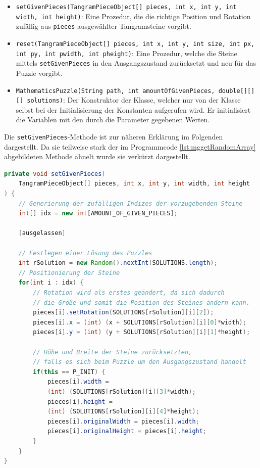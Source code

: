 \begin{sloppypar}
\begin{itemize}
        \item \texttt{setGivenPieces(TangramPieceObject[] pieces, int x, int y, int width, int height)}: Eine Prozedur, die die richtige Position und Rotation zufällig aus \texttt{pieces} ausgewählter Tangramsteine vorgibt.
        \item \texttt{reset(TangramPieceObject[] pieces, int x, int y, int size, int px, int py, int pwidth, int pheight)}: Eine Prozedur, welche die Steine mittels \texttt{setGivenPieces} in den Ausgangszustand zurücksetzt und neu für das Puzzle vorgibt.
        \item \texttt{MathematicsPuzzle(String path, int amountOfGivenPieces, double[][][] solutions)}: Der Konstruktor der Klasse, welcher nur von der Klasse selbst bei der Initialisierung der Konstanten aufgerufen wird.
            Er initialisiert die Variablen mit den durch die Parameter gegebenen Werten.
    \end{itemize}
\end{sloppypar}

Die \texttt{setGivenPieces}-Methode ist zur näheren Erklärung im Folgenden dargestellt.
Da sie teilweise stark der im Programmcode \ref{lst:mggetRandomArray} abgebildeten Methode ähnelt wurde sie verkürzt dargestellt.

\begin{lstlisting}[caption=update-Methode des TangramPieceObject, label=lst:mggetRandomArray, captionpos=t, language=Java]
private void setGivenPieces(
    TangramPieceObject[] pieces, int x, int y, int width, int height
) {
    // Generierung der zufälligen Indizes der vorzugebenden Steine
    int[] idx = new int[AMOUNT_OF_GIVEN_PIECES];
    
    [ausgelassen]

    // Festlegen einer Lösung des Puzzles
    int rSolution = new Random().nextInt(SOLUTIONS.length);
    // Positionierung der Steine
    for(int i : idx) {
        // Rotation wird als erstes geändert, da sich dadurch
        // die Größe und somit die Position des Steines ändern kann.
        pieces[i].setRotation(SOLUTIONS[rSolution][i][2]);
        pieces[i].x = (int) (x + SOLUTIONS[rSolution][i][0]*width);
        pieces[i].y = (int) (y + SOLUTIONS[rSolution][i][1]*height);

        // Höhe und Breite der Steine zurücksetzten,
        // falls es sich beim Puzzle um den Ausgangszustand handelt
        if(this == P_INIT) {
            pieces[i].width =
            (int) (SOLUTIONS[rSolution][i][3]*width);
            pieces[i].height =
            (int) (SOLUTIONS[rSolution][i][4]*height);
            pieces[i].originalWidth = pieces[i].width;
            pieces[i].originalHeight = pieces[i].height;
        }
    }
}
\end{lstlisting}

